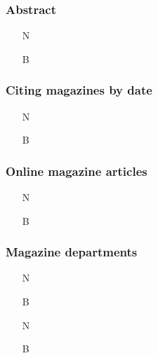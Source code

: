 \documentclass[11pt,letterpaper,oneside]{article}
\begin{document}
\setcounter{subsubsection}{196}
\subsubsection{Abstract}

\begin{itemize}
\item[N] 

\item[B] 
\end{itemize}

\setcounter{subsubsection}{198}
\subsubsection{Citing magazines by date}

\begin{itemize}
\item[N] 

\item[B] 
\end{itemize}

\subsubsection{Online magazine articles}

\begin{itemize}
\item[N] 

\item[B] 
\end{itemize}

\setcounter{subsubsection}{201}
\subsubsection{Magazine departments}

\begin{itemize}
\item[N] 

\item[B] 

\item[N] 

\item[B] 
\end{itemize}
\end{document}
